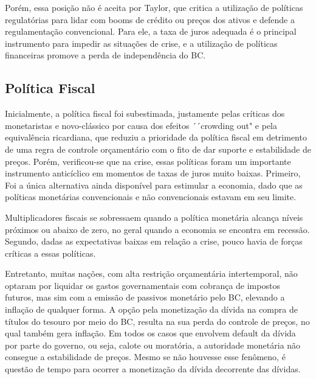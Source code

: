 \documentclass[report]{uftex}
\begin{document}

Porém, essa posição não é aceita por Taylor, que critica a utilização de políticas regulatórias para lidar com booms de crédito ou preços dos ativos e defende a regulamentação convencional. Para ele, a taxa de juros adequada é o principal instrumento para impedir as situações de crise, e a utilização de políticas financeiras promove a perda de independência do BC.

\subsection{Política Fiscal}

Inicialmente, a política fiscal foi subestimada, justamente pelas críticas dos monetaristas e novo-clássico por causa dos efeitos ´´crowding out" e pela equivalência ricardiana, que reduziu a prioridade da política fiscal em detrimento de uma regra de controle orçamentário com o fito de dar suporte e estabilidade de preços. Porém, verificou-se que na crise, essas políticas foram um importante instrumento anticíclico em momentos de taxas de juros muito baixas. Primeiro, Foi a única alternativa ainda disponível para estimular a economia, dado que as políticas monetárias convencionais e não convencionais estavam em seu limite.  

Multiplicadores fiscais se sobressaem quando a política monetária alcança níveis próximos ou abaixo de zero, no geral quando a economia se encontra em recessão. Segundo, dadas as expectativas baixas em relação a crise, pouco havia de forças críticas a essas políticas.

Entretanto, muitas nações, com alta restrição orçamentária intertemporal, não optaram por liquidar os gastos governamentais com cobrança de impostos futuros, mas sim com a emissão de passivos monetário pelo BC, elevando a inflação de qualquer forma. A opção pela monetização da dívida na compra de títulos do tesouro por meio do BC, resulta na sua perda do controle de preços, no qual também gera inflação. Em todos os casos que envolvem default da dívida por parte do governo, ou seja, calote ou moratória, a autoridade monetária não consegue a estabilidade de preços. Mesmo se não houvesse esse fenômeno, é questão de tempo para ocorrer a monetização da dívida decorrente das dívidas.
\end{document}
